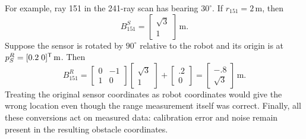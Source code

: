 For example, ray 151 in the 241-ray scan has bearing $30^\circ$.
If $r_{151}=2\,\mathrm m$, then
\[
 B_{151}^S=\begin{bmatrix}\sqrt3\\1\end{bmatrix}\,\mathrm m.
\]
Suppose the sensor is rotated by $90^\circ$ relative to the robot and its
origin is at $p_S^R=[0.2\;0]^{\mathsf T}\,\mathrm m$. Then
\[
 B_{151}^R=\begin{bmatrix}0&-1\\1&0\end{bmatrix}
 \begin{bmatrix}\sqrt3\\1\end{bmatrix}
 +\begin{bmatrix}.2\\0\end{bmatrix}
 =\begin{bmatrix}-.8\\\sqrt3\end{bmatrix}\,\mathrm m.
\]
Treating the original sensor coordinates as robot coordinates would give
the wrong location even though the range measurement itself was correct.
Finally, all these conversions act on measured data: calibration error and
noise remain present in the resulting obstacle coordinates.

\clearpage

